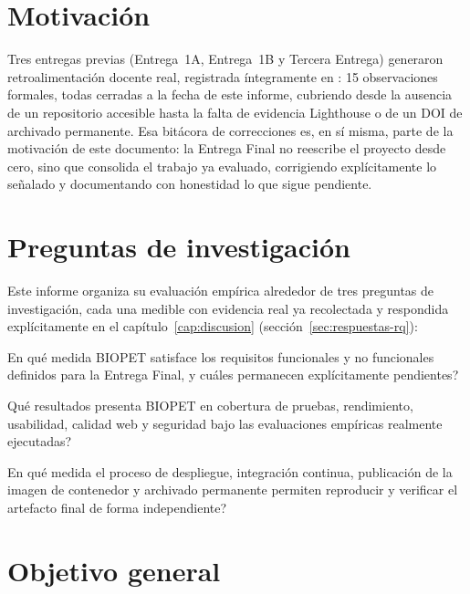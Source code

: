 \section{Motivaci\'on}

Tres entregas previas (Entrega~1A, Entrega~1B y Tercera Entrega) generaron
retroalimentaci\'on docente real, registrada \'integramente en
: 15 observaciones formales,
todas cerradas a la fecha de este informe, cubriendo desde la ausencia de un
repositorio accesible hasta la falta de evidencia Lighthouse o de un DOI de
archivado permanente. Esa bitácora de correcciones es, en s\'i misma, parte
de la motivaci\'on de este documento: la Entrega Final no reescribe el
proyecto desde cero, sino que consolida el trabajo ya evaluado, corrigiendo
expl\'icitamente lo se\~nalado y documentando con honestidad lo que sigue
pendiente.

\section{Preguntas de investigaci\'on}
\label{sec:preguntas-investigacion}

Este informe organiza su evaluaci\'on emp\'irica alrededor de tres
preguntas de investigaci\'on, cada una medible con evidencia real ya
recolectada y respondida expl\'icitamente en el
cap\'itulo~\ref{cap:discusion} (secci\'on~\ref{sec:respuestas-rq}):

\begin{description}[nosep]
  \item[RQ1.] \textquestiondown En qu\'e medida BIOPET satisface los
    requisitos funcionales y no funcionales definidos para la Entrega
    Final, y cu\'ales permanecen expl\'icitamente pendientes?
  \item[RQ2.] \textquestiondown Qu\'e resultados presenta BIOPET en
    cobertura de pruebas, rendimiento, usabilidad, calidad web y seguridad
    bajo las evaluaciones emp\'iricas realmente ejecutadas?
  \item[RQ3.] \textquestiondown En qu\'e medida el proceso de despliegue,
    integraci\'on continua, publicaci\'on de la imagen de contenedor y
    archivado permanente permiten reproducir y verificar el artefacto
    final de forma independiente?
\end{description}

\section{Objetivo general}

